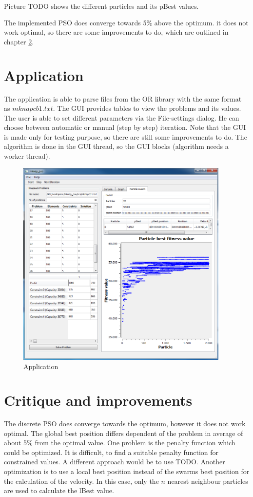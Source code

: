 \documentclass{article}
\begin{document}
Picture TODO shows the different particles and its pBest values.

The implemented PSO does converge towards 5\% above the optimum. it does not work optimal, so there are some improvements to do, which are outlined in chapter \ref{lbl-impr}.

\section{Application}
\label{lbl-app}
The application is able to parse files from the OR library with the same format as $mknapcb1.txt$. The GUI   provides tables to view the problems and its values. The user is able to set different parameters via the File-settings dialog. He can choose between automatic or manual (step by step) iteration. Note that the GUI is made only for testing purpose, so there are still some improvements to do. The algorithm is done in the GUI thread, so the GUI blocks (algorithm needs a worker thread).

\begin{figure}[H]
    \centering
    \includegraphics[width=400px]{images/image_main.PNG}
    \caption{Application}
    \label{fig-app}
\end{figure}

\section{Critique and improvements}
\label{lbl-impr}
The discrete PSO does converge towards the optimum, however it does not work optimal. The global best position differs dependent of the problem in average of about 5\% from the optimal value. One problem is the penalty function which could be optimized. It is difficult, to find a suitable penalty function for constrained values. A different approach would be to use TODO. Another optimization is to use a local best position instead of the swarms best position for the calculation of the velocity. In this case, only the $n$ nearest neighbour particles are used to calculate the lBest value.
\end{document}
